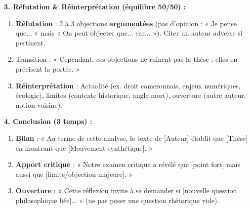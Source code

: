 \documentclass[11pt]{article}
\newcommand{\cle}[1]{{\popxbold\color{popdark}#1}}
\begin{document}
\begin{bilan}
\textbf{3. Réfutation \& Réinterprétation (équilibre 50/50) :}
\begin{enumerate}
  \item \textbf{Réfutation} : 2 à 3 objections \textbf{argumentées} (pas d'opinion : « Je pense que... » mais « On peut objecter que... car... »). Citer un auteur adverse si pertinent.
  \item \cle{Transition} : « Cependant, ces objections ne ruinent pas la thèse ; elles en précisent la portée. »
  \item \textbf{Réinterprétation} : Actualité (ex. droit camerounais, enjeux numériques, écologie), limites (contexte historique, angle mort), ouverture (autre auteur, notion voisine).
\end{enumerate}

\textbf{4. Conclusion (3 temps) :}
\begin{enumerate}
  \item \textbf{Bilan} : « Au terme de cette analyse, le texte de [Auteur] établit que [Thèse] en montrant que [Mouvement synthétique]. »
  \item \textbf{Apport critique} : « Notre examen critique a révélé que [point fort] mais aussi que [limite/objection majeure]. »
  \item \textbf{Ouverture} : « Cette réflexion invite à se demander si [nouvelle question philosophique liée]... » (ne pas poser une question rhétorique vide).
\end{enumerate}
\end{bilan}
\end{document}
